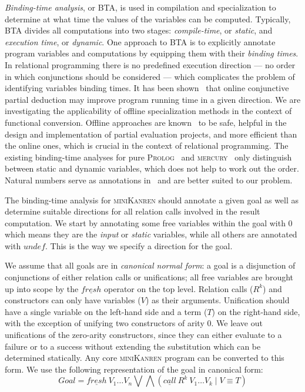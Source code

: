 \documentclass[submission,copyright,creativecommons]{eptcs}
\newcommand{\miniKanren}{\textsc{miniKanren}}
\newcommand{\prolog}{\textsc{Prolog}}
\newcommand{\mercury}{\textsc{mercury}}
\newcommand\undef{unde\!f}
\newcommand\fresh{f\!resh}
\begin{document}
\emph{Binding-time analysis}, or BTA, is used in compilation and specialization to determine at what time the values of the variables can be computed.
Typically, BTA divides all computations into two stages: \emph{compile-time}, or \emph{static}, and \emph{execution time}, or \emph{dynamic}.
One approach to BTA is to explicitly annotate program variables and computations by equipping them with their \emph{binding times}.
In relational programming there is no predefined execution direction --- no order in which conjunctions should be considered ---
which complicates the problem of identifying variables binding times.
It has been shown~\cite{lozov2019relational} that online conjunctive partial deduction may improve program running time in a given direction.
We are investigating the applicability of offline specialization methods in the context of functional conversion.
Offline approaches are known~\cite{jones1993partial} to be safe, helpful in the design and implementation of partial evaluation projects, and more efficient than the online ones, which is crucial in the context of relational programming.
The existing binding-time analyses for pure \prolog{}~\cite{craig2004fully} and \mercury{}~\cite{vanhoof2004binding} only distinguish between static and dynamic variables, which does not help to work out the order.
Natural numbers serve as annotations in~\cite{Thiemann1997AUF} and are better suited to our problem.


The binding-time analysis for \miniKanren{} should annotate a given goal as well as determine suitable directions for all relation calls involved in the result computation.
We start by annotating some free variables within the goal with $0$ which means they are the \emph{input} or \emph{static} variables, while all others are annotated with $\undef{}$.
This is the way we specify a direction for the goal.

We assume that all goals are in \emph{canonical normal form}: a goal is a disjunction of conjunctions of either relation calls or unifications; all free variables are brought up into scope by the $\underline{\fresh{}}$ operator on the top level.
Relation calls ($R^k$) and constructors can only have variables ($V$) as their arguments. Unification should have a single variable on the left-hand side and a term ($T$) on the right-hand side, with the exception of unifying two constructors of arity $0$.
We leave out unifications of the zero-arity constructors, since they can either evaluate to a failure or to a success without extending the substitution which can be determined statically.
Any core \miniKanren{} program can be converted to this form.
We use the following representation of the goal in canonical form:
$$Goal = \underline{\fresh{}} \ V_1 \dots V_n \bigvee \bigwedge (\underline{call} \ R^k \ V_1 \dots V_k \mid V \equiv T)$$
\end{document}
